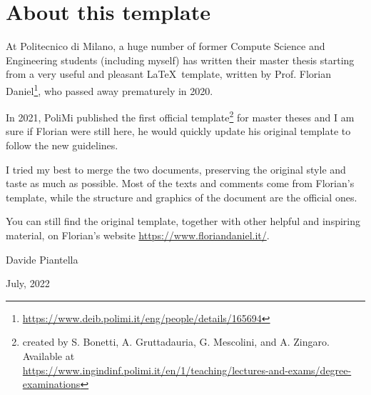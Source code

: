 \section*{About this template}
At Politecnico di Milano, a huge number of former Compute Science and Engineering students (including myself) has written their master thesis starting from a very useful and pleasant \LaTeX~template, written by Prof. Florian Daniel\footnote{\url{https://www.deib.polimi.it/eng/people/details/165694}}, who passed away prematurely in 2020.

In 2021, PoliMi published the first official template\footnote{created by S. Bonetti, A. Gruttadauria, G. Mescolini, and A. Zingaro. Available at\\ \url{https://www.ingindinf.polimi.it/en/1/teaching/lectures-and-exams/degree-examinations}} for master theses and I am sure if Florian were still here, he would quickly update his original template to follow the new guidelines. 

I tried my best to merge the two documents, preserving the original style and taste as much as possible.
Most of the texts and comments come from Florian's template, while the structure and graphics of the document are the official ones.

You can still find the original template, together with other helpful and inspiring material, on Florian's website \url{https://www.floriandaniel.it/}.

\hfill Davide Piantella

\hfill July, 2022

\bigskip

